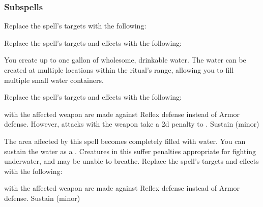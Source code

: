 \subsubsection{Subspells}
Replace the spell's targets with the following:
\begin{spellcontent}
\begin{augmenttargetinginfo}
\end{augmenttargetinginfo}
\end{spellcontent}
Replace the spell's targets and effects with the following:
\begin{spellcontent}
\begin{augmenttargetinginfo}
\spellrng{\rngclose}
\end{augmenttargetinginfo}
\begin{augmenteffects}
\spelleffect
You create up to one gallon of wholesome, drinkable water.
The water can be created at multiple locations within the ritual's range, allowing you to fill multiple small water containers.
\end{augmenteffects}
\end{spellcontent}
Replace the spell's targets and effects with the following:
\begin{spellcontent}
\begin{augmenttargetinginfo}
\end{augmenttargetinginfo}
\begin{augmenteffects}
\spelleffect
{} with the affected weapon are made against Reflex defense instead of Armor defense.
However, attacks with the weapon take a \minus2d penalty to .
\spelldur Sustain (minor)
\end{augmenteffects}
\end{spellcontent}
The area affected by this spell becomes completely filled with water.
You can sustain the water as a .
Creatures in this  suffer penalties appropriate for fighting underwater, and may be unable to breathe.
Replace the spell's targets and effects with the following:
\begin{spellcontent}
\begin{augmenttargetinginfo}
\end{augmenttargetinginfo}
\begin{augmenteffects}
\spelleffect
{} with the affected weapon are made against Reflex defense instead of Armor defense.
\spelldur Sustain (minor)
\end{augmenteffects}
\end{spellcontent}
